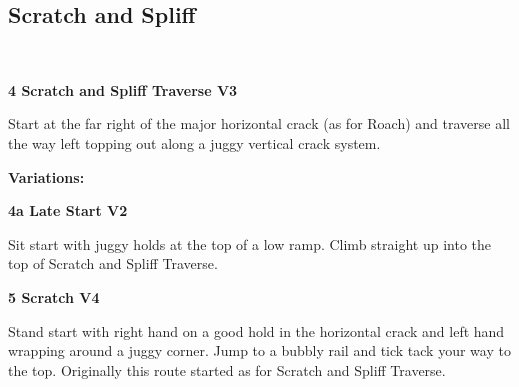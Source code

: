 \begin{multicols}{2}
			\begin{minipage}{\columnwidth}
			\subsection*{Scratch and Spliff}\label{bf:Scratch and Spliff}
			\
			
			\end{minipage}
			
					\begin{minipage}{\linewidth}	
					\label{rt:Scratch and Spliff Traverse}
\colorbox{green!20}{
\parbox{0.95\textwidth}{
\textbf{
4 Scratch and Spliff Traverse V3     
}
}
}

					\begin{adjustwidth}{0.5cm}{}				
					Start at the far right of the major horizontal crack (as for Roach) and traverse all the way left topping out along a juggy vertical crack system.
					\end{adjustwidth}
					\end{minipage}
						\begin{adjustwidth}{0.5cm}{}				
						\textbf{Variations:} \newline
							\begin{minipage}{\linewidth}	
							\label{vr:Late Start}
\colorbox{green!20}{
\parbox{0.95\textwidth}{
\textbf{
4a Late Start V2    
}
}
}

							\begin{adjustwidth}{0.5cm}{}				
							Sit start with juggy holds at the top of a low ramp. Climb straight up into the top of Scratch and Spliff Traverse.
							\end{adjustwidth}
							\end{minipage}
						\end{adjustwidth}
					\begin{minipage}{\linewidth}	
					\label{rt:Scratch}
\colorbox{RoyalBlue!20}{
\parbox{0.95\textwidth}{
\textbf{
5 Scratch V4    
}
}
}

					\begin{adjustwidth}{0.5cm}{}				
					Stand start with right hand on a good hold in the horizontal crack and left hand wrapping around a juggy corner. Jump to a bubbly rail and tick tack your way to the top. Originally this route started as for Scratch and Spliff Traverse.
					\end{adjustwidth}
					\end{minipage}


\end{multicols}
